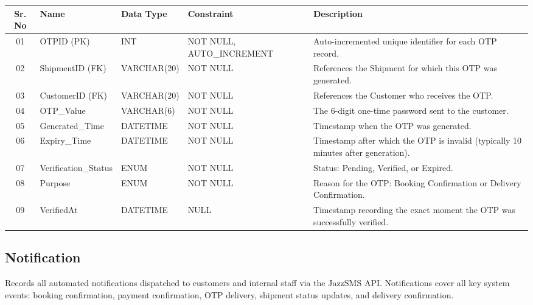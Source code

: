 \documentclass[12pt,a4paper]{report}
\begin{document}
\begin{longtable}{|c|p{3.8cm}|p{2.5cm}|p{3.5cm}|p{5.5cm}|}
\hline
\textbf{Sr. No} & \textbf{Name} & \textbf{Data Type} & \textbf{Constraint} & \textbf{Description} \\
\hline
01 & OTPID (PK) & INT & NOT NULL, AUTO\_INCREMENT & Auto-incremented unique identifier for each OTP record. \\
\hline
02 & ShipmentID (FK) & VARCHAR(20) & NOT NULL & References the Shipment for which this OTP was generated. \\
\hline
03 & CustomerID (FK) & VARCHAR(20) & NOT NULL & References the Customer who receives the OTP. \\
\hline
04 & OTP\_Value & VARCHAR(6) & NOT NULL & The 6-digit one-time password sent to the customer. \\
\hline
05 & Generated\_Time & DATETIME & NOT NULL & Timestamp when the OTP was generated. \\
\hline
06 & Expiry\_Time & DATETIME & NOT NULL & Timestamp after which the OTP is invalid (typically 10 minutes after generation). \\
\hline
07 & Verification\_Status & ENUM & NOT NULL & Status: Pending, Verified, or Expired. \\
\hline
08 & Purpose & ENUM & NOT NULL & Reason for the OTP: Booking Confirmation or Delivery Confirmation. \\
\hline
09 & VerifiedAt & DATETIME & NULL & Timestamp recording the exact moment the OTP was successfully verified. \\
\hline
\end{longtable}


\subsection{Notification}

Records all automated notifications dispatched to customers and internal staff via the JazzSMS API. Notifications cover all key system events: booking confirmation, payment confirmation, OTP delivery, shipment status updates, and delivery confirmation.
\end{document}
